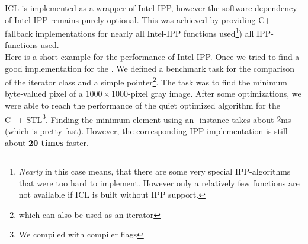 \begin{enumerate}
ICL is implemented as a wrapper of Intel-IPP, however the software dependency of Intel-IPP remains purely optional. This was achieved by providing C++-fallback implementations for nearly all Intel-IPP functions used\footnote{\emph{Nearly} in this case means, that there are some very special IPP-algorithms that were too hard to implement. However only a relatively few functions are not available if ICL is built without IPP support.}) all IPP-functions used. \\
Here is a short example for the performance of Intel-IPP. Once we tried to find a good implementation for the . We defined a benchmark task for the comparison of the iterator class and a simple pointer\footnote{which can also be used as an iterator}. The task was to find the minimum byte-valued pixel of a $1000\times{}1000$-pixel gray image. After some optimizations, we were able to reach the performance of the quiet optimized  algorithm for the C++-STL\footnote{We compiled with compiler flags }. Finding the minimum element using an -instance takes about $2$ms (which is pretty fast). However, the corresponding IPP implementation is still about \textbf{20 times} faster.
\end{enumerate}

